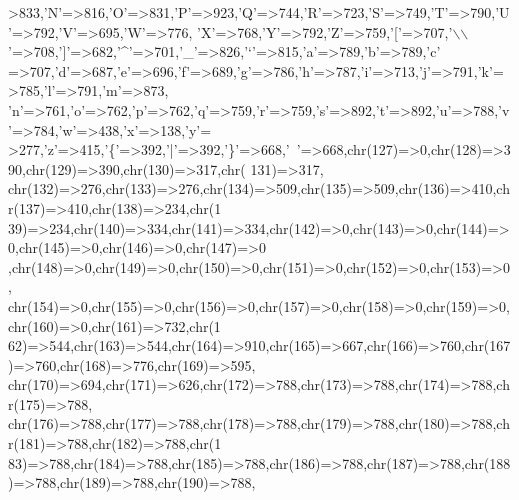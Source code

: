 \begin{DoxyCode}
      >833,\textcolor{charliteral}{'N'}=>816,\textcolor{charliteral}{'O'}=>831,\textcolor{charliteral}{'P'}=>923,\textcolor{charliteral}{'Q'}=>744,\textcolor{charliteral}{'R'}=>723,\textcolor{charliteral}{'S'}=>749,\textcolor{charliteral}{'T'}=>790,\textcolor{charliteral}{'U'}=>792,\textcolor{charliteral}{'V'}=>695,\textcolor{charliteral}{'W'}=>776,
    \textcolor{charliteral}{'X'}=>768,\textcolor{charliteral}{'Y'}=>792,\textcolor{charliteral}{'Z'}=>759,\textcolor{charliteral}{'['}=>707,\textcolor{charliteral}{'\(\backslash\)\(\backslash\)'}=>708,\textcolor{charliteral}{']'}=>682,\textcolor{charliteral}{'^'}=>701,\textcolor{charliteral}{'\_'}=>826,\textcolor{charliteral}{'`'}=>815,\textcolor{charliteral}{'a'}=>789,\textcolor{charliteral}{'b'}=>789,\textcolor{charliteral}{'c'}
      =>707,\textcolor{charliteral}{'d'}=>687,\textcolor{charliteral}{'e'}=>696,\textcolor{charliteral}{'f'}=>689,\textcolor{charliteral}{'g'}=>786,\textcolor{charliteral}{'h'}=>787,\textcolor{charliteral}{'i'}=>713,\textcolor{charliteral}{'j'}=>791,\textcolor{charliteral}{'k'}=>785,\textcolor{charliteral}{'l'}=>791,\textcolor{charliteral}{'m'}=>873,
    \textcolor{charliteral}{'n'}=>761,\textcolor{charliteral}{'o'}=>762,\textcolor{charliteral}{'p'}=>762,\textcolor{charliteral}{'q'}=>759,\textcolor{charliteral}{'r'}=>759,\textcolor{charliteral}{'s'}=>892,\textcolor{charliteral}{'t'}=>892,\textcolor{charliteral}{'u'}=>788,\textcolor{charliteral}{'v'}=>784,\textcolor{charliteral}{'w'}=>438,\textcolor{charliteral}{'x'}=>138,\textcolor{charliteral}{'y'}=
      >277,\textcolor{charliteral}{'z'}=>415,\textcolor{charliteral}{'\{'}=>392,\textcolor{charliteral}{'|'}=>392,\textcolor{charliteral}{'\}'}=>668,\textcolor{charliteral}{'~'}=>668,chr(127)=>0,chr(128)=>390,chr(129)=>390,chr(130)=>317,chr(
      131)=>317,
    chr(132)=>276,chr(133)=>276,chr(134)=>509,chr(135)=>509,chr(136)=>410,chr(137)=>410,chr(138)=>234,chr(1
      39)=>234,chr(140)=>334,chr(141)=>334,chr(142)=>0,chr(143)=>0,chr(144)=>0,chr(145)=>0,chr(146)=>0,chr(147)=>0
      ,chr(148)=>0,chr(149)=>0,chr(150)=>0,chr(151)=>0,chr(152)=>0,chr(153)=>0,
    chr(154)=>0,chr(155)=>0,chr(156)=>0,chr(157)=>0,chr(158)=>0,chr(159)=>0,chr(160)=>0,chr(161)=>732,chr(1
      62)=>544,chr(163)=>544,chr(164)=>910,chr(165)=>667,chr(166)=>760,chr(167)=>760,chr(168)=>776,chr(169)=>595,
      chr(170)=>694,chr(171)=>626,chr(172)=>788,chr(173)=>788,chr(174)=>788,chr(175)=>788,
    chr(176)=>788,chr(177)=>788,chr(178)=>788,chr(179)=>788,chr(180)=>788,chr(181)=>788,chr(182)=>788,chr(1
      83)=>788,chr(184)=>788,chr(185)=>788,chr(186)=>788,chr(187)=>788,chr(188)=>788,chr(189)=>788,chr(190)=>788,

\end{DoxyCode}

